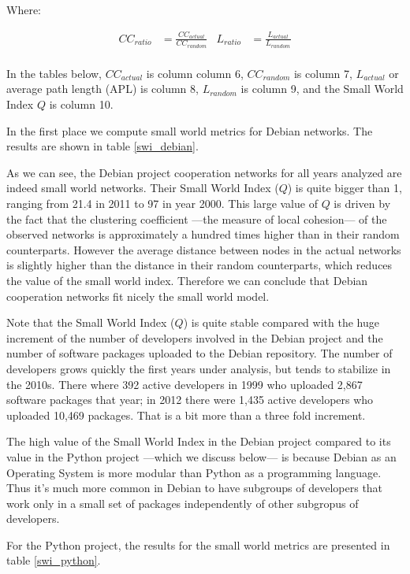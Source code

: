 Where:

\begin{align}
CC_{ratio}& = \frac{CC_{actual}}{CC_{random}} &
L_{ratio}& = \frac{L_{actual}}{L_{random}} \nonumber \\
\end{align}

In the tables below, $CC_{actual}$ is column column 6, $CC_{random}$ is column 7, $L_{actual}$ or average path length (APL) is column 8, $L_{random}$ is column 9, and the Small World Index $Q$ is column 10.

In the first place we compute small world metrics for Debian networks. The results are shown in table \ref{swi_debian}.



As we can see, the Debian project cooperation networks for all years analyzed are indeed small world networks. Their Small World Index ($Q$) is quite bigger than 1, ranging from 21.4 in 2011 to 97 in year 2000. This large value of $Q$ is driven by the fact that the clustering coefficient ---the measure of local cohesion--- of the observed networks is approximately a hundred times higher than in their random counterparts. However the average distance between nodes in the actual networks is slightly higher than the distance in their random counterparts, which reduces the value of the small world index. Therefore we can conclude that Debian cooperation networks fit nicely the small world model. 

Note that the Small World Index ($Q$) is quite stable compared with the huge increment of the number of developers involved in the Debian project and the number of software packages uploaded to the Debian repository. The number of developers grows quickly the first years under analysis, but tends to stabilize in the 2010s. There where 392 active developers in 1999 who uploaded 2,867 software packages that year; in 2012 there were 1,435 active developers who uploaded 10,469 packages. That is a bit more than a three fold increment.

The high value of the Small World Index in the Debian project compared to its value in the Python project ---which we discuss below--- is because Debian as an Operating System is more modular than Python as a programming language. Thus it's much more common in Debian to have subgroups of developers that work only in a small set of packages independently of other subgropus of developers.

For the Python project, the results for the small world metrics are presented in table \ref{swi_python}.

